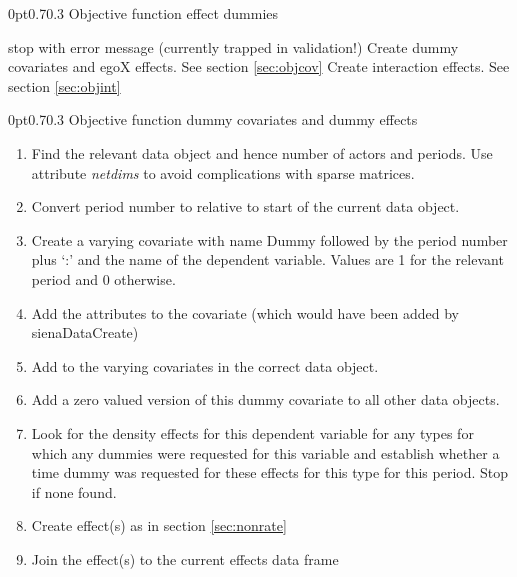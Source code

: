 \documentclass[12pt,a4paper]{article}
\makeatletter
\renewcommand{\=}{\,=\,}
\newcommand{\+}{\,+\,}
\newcommand{\nnm}[1]{\textsf{\small\textit{#1}}}
\renewcommand{\subsection}{\@startsection{subsection}{2}
                {0pt}{0.7\baselineskip}{0.3\baselineskip}
                {\sffamily} }
\makeatother
\begin{document}
\subsection{Objective function effect dummies}
\label{sec:obj}
\begin{algorithmic}
\STATE  stop with error message (currently trapped in validation!)
\ENDIF
{}
\STATE Create dummy covariates and egoX effects. See section \ref{sec:objcov}
\ENDFOR
\STATE
{}
\STATE Create interaction effects. See section \ref{sec:objint}

\ENDFOR
\ENDFOR
\end{algorithmic}
\subsection{Objective function dummy covariates and dummy effects}
\label{sec:objcov}
\begin{enumerate}
\item Find the relevant data object and hence number of actors and periods. Use
  attribute \nnm{netdims} to avoid complications with sparse matrices.
\item Convert period number to relative to start of the current data object.
\item Create a varying covariate with name Dummy followed by the period number
  plus `:' and the name of the dependent variable. Values are 1 for the relevant
  period and 0 otherwise.
\item Add the attributes to the covariate (which would have been added by
sienaDataCreate)
\item Add to the varying covariates in the correct data object.
\item Add a zero valued version of this dummy covariate to all other data
objects.
\item Look for the density effects for this dependent variable for any types
for which any dummies were requested for this variable and establish
whether a time dummy was requested for these effects for this type for
this period. Stop if none found.
\item Create effect(s) as in section \ref{sec:nonrate}
\item Join the effect(s) to the current effects data frame
\end{enumerate}
\end{document}
